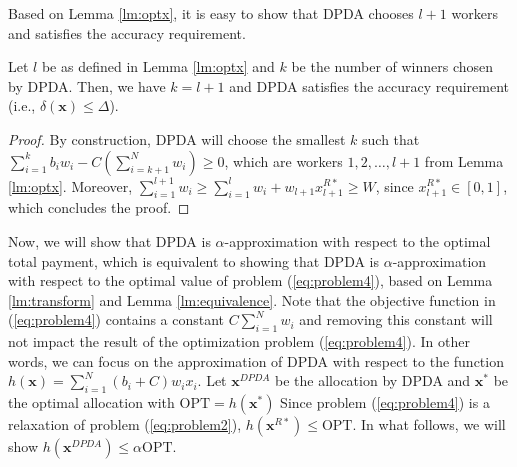 	Based on Lemma \ref{lm:optx}, it is easy to show that DPDA chooses $l+1$ workers and satisfies the accuracy requirement.
	
	\begin{lm}\label{lm:k}
		Let $l$ be as defined in Lemma \ref{lm:optx} and $k$ be the number of winners chosen by DPDA. Then, we have $k=l+1$ and DPDA satisfies the accuracy requirement  (i.e., $\delta(\mathbf{x})\le \Delta$).
	\end{lm}
	\begin{proof}
		By construction, DPDA will choose the smallest $k$ such that $\sum_{i=1}^{k}b_iw_i-C(\sum_{i=k+1}^{N}w_i)\ge 0$, which are workers $1, 2,\dots,l+1$ from Lemma \ref{lm:optx}. Moreover, $\sum_{i=1}^{l+1}w_i\ge\sum_{i=1}^{l}w_i+w_{l+1}x_{l+1}^{R*}\ge W$, since $x_{l+1}^{R*}\in[0,1]$, which concludes the proof.
	\end{proof}
	
	Now, we will show that DPDA is $\alpha$-approximation with respect to the optimal total payment, which is equivalent to showing that DPDA is $\alpha$-approximation with respect to the optimal value of problem (\ref{eq:problem4}), based on Lemma \ref{lm:transform} and Lemma \ref{lm:equivalence}. Note that the objective function in (\ref{eq:problem4}) contains a constant $C\sum_{i=1}^{N}w_i$ and removing this constant will not impact the result of the optimization problem (\ref{eq:problem4}). In other words, we can focus on the approximation of DPDA with respect to the function $h(\mathbf{x})=\sum_{i=1}^{N}(b_i+C)w_ix_i$. Let $\mathbf{x}^{DPDA}$ be the allocation by DPDA and $\mathbf{x}^*$ be the optimal allocation with $\text{OPT}=h(\mathbf{x}^*)$ Since problem (\ref{eq:problem4}) is a relaxation of problem (\ref{eq:problem2}), $h(\mathbf{x}^{R*})\le \text{OPT}$. In what follows, we will show $h(\mathbf{x}^{DPDA})\le\alpha\text{OPT}$.
	
